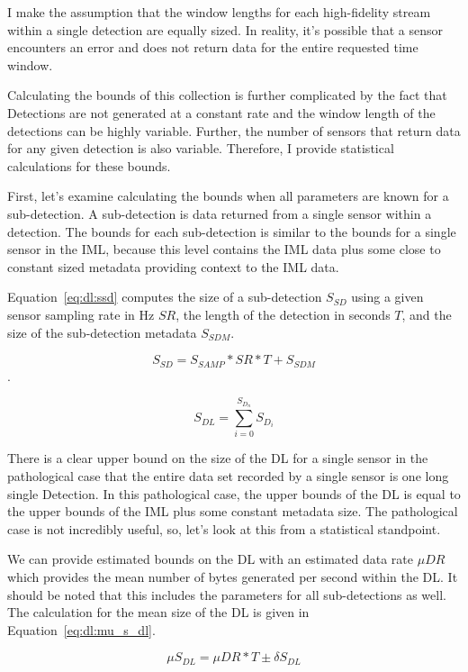 I make the assumption that the window lengths for each high-fidelity stream within a single detection are equally sized. In reality, it's possible that a sensor encounters an error and does not return data for the entire requested time window.

Calculating the bounds of this collection is further complicated by the fact that Detections are not generated at a constant rate and the window length of the detections can be highly variable. Further, the number of sensors that return data for any given detection is also variable. Therefore, I provide statistical calculations for these bounds.

First, let's examine calculating the bounds when all parameters are known for a sub-detection. A sub-detection is data returned from a single sensor within a detection. The bounds for each sub-detection is similar to the bounds for a single sensor in the IML, because this level contains the IML data plus some close to constant sized metadata providing context to the IML data.

Equation~\ref{eq:dl:ssd} computes the size of a sub-detection $S_{SD}$ using a given sensor sampling rate in Hz $SR$, the length of the detection in seconds $T$, and the size of the sub-detection metadata $S_{SDM}$.

\begin{equation}\label{eq:dl:ssd}
	S_{SD} = S_{SAMP} * SR * T + S_{SDM}
\end{equation}.

\begin{equation}\label{eq:dl:dl}
	S_{DL} = \sum_{i=0}^{S_{D_{n}}} S_{D_{i}}
\end{equation}

There is a clear upper bound on the size of the DL for a single sensor in the pathological case that the entire data set recorded by a single sensor is one long single Detection. In this pathological case, the upper bounds of the DL is equal to the upper bounds of the IML plus some constant metadata size. The pathological case is not incredibly useful, so, let's look at this from a statistical standpoint.

We can provide estimated bounds on the DL with an estimated data rate $\mu DR$ which provides the mean number of bytes generated per second within the DL\@. It should be noted that this includes the parameters for all sub-detections as well. The calculation for the mean size of the DL is given in Equation~\ref{eq:dl:mu_s_dl}.

\begin{equation}\label{eq:dl:mu_s_dl}
	\mu S_{DL} = \mu DR * T \pm \delta S_{DL}
\end{equation}

